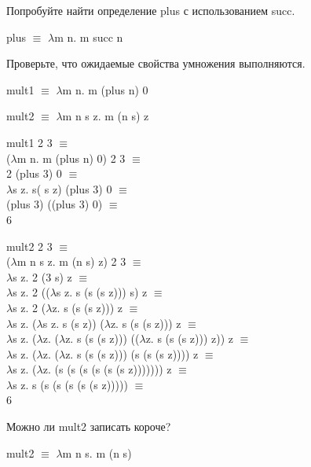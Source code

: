 \documentclass[a4paper,12pt]{article} %
\begin{document}
\begin{enumerate}

{\item Попробуйте найти определение plus с использованием succ.}

	\begin{adjustwidth}{1em}{0pt}
	plus $\equiv$ $\lambda$m n. m succ n
    \end{adjustwidth}

{\item Проверьте, что ожидаемые свойства умножения выполняются.}

mult1 $\equiv$ $\lambda$m n. m (plus n) 0

mult2 $\equiv$ $\lambda$m n s z. m (n s) z
    
	\begin{adjustwidth}{1em}{0pt}
	mult1 2 3 $\equiv$ \\
    ($\lambda$m n. m (plus n) 0) 2 3 $\equiv$ \\
    2 (plus 3) 0 $\equiv$ \\
    $\lambda$s z. s( s z) (plus 3) 0 $\equiv$ \\
    (plus 3) ((plus 3) 0) $\equiv$ \\
    6
    
    mult2 2 3 $\equiv$ \\
    ($\lambda$m n s z. m (n s) z) 2 3 $\equiv$ \\
    $\lambda$s z. 2 (3 s) z $\equiv$ \\
    $\lambda$s z. 2 (($\lambda$s z. s (s (s z))) s) z $\equiv$ \\
    $\lambda$s z. 2 ($\lambda$z. s (s (s z))) z $\equiv$ \\
    $\lambda$s z. ($\lambda$s z. s (s z)) ($\lambda$z. s (s (s z))) z $\equiv$ \\
    $\lambda$s z. ($\lambda$z. ($\lambda$z. s (s (s z))) (($\lambda$z. s (s (s z))) z)) z $\equiv$ \\
    $\lambda$s z. ($\lambda$z. ($\lambda$z. s (s (s z))) (s (s (s z)))) z $\equiv$ \\
    $\lambda$s z. ($\lambda$z. (s (s (s (s (s (s z))))))) z $\equiv$ \\
    $\lambda$s z. s (s (s (s (s (s z))))) $\equiv$ \\
    6
    \end{adjustwidth}

{\item Можно ли mult2 записать короче?}

	\begin{adjustwidth}{1em}{0pt}
	mult2 $\equiv$ $\lambda$m n s. m (n s)
    \end{adjustwidth}

\end{enumerate}
\end{document}
